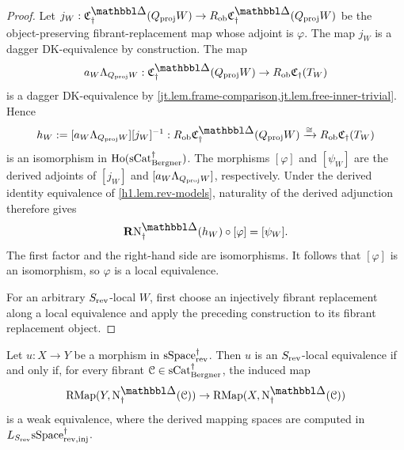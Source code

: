 \documentclass[a4paper,dvipdfmx,11pt]{amsart}
\begin{document}
\begin{proof}
  Let $j_W : \frakC^{\prism}_{\dag}(Q_{\proj}W) \to R_{\rmob}\frakC^{\prism}_{\dag}(Q_{\proj}W)$ be the object-preserving fibrant-replacement map whose adjoint is $\varphi$.
  The map $j_W$ is a dagger DK-equivalence by construction.
  The map
  \begin{align}
    a_W\Lambda_{Q_{\proj}W}:
    \frakC^{\prism}_{\dag}(Q_{\proj}W)
    \to
    R_{\rmob}\frakC_{\dag}(T_W)
  \end{align}
  is a dagger DK-equivalence by \cref{jt.lem.frame-comparison,jt.lem.free-inner-trivial}.
  Hence
  \begin{align}
    h_W
    :=
    [a_W\Lambda_{Q_{\proj}W}][j_W]^{-1}:
    R_{\rmob}
    \frakC^{\prism}_{\dag}(Q_{\proj}W)
    \xrightarrow{\cong}
    R_{\rmob}\frakC_{\dag}(T_W)
  \end{align}
  is an isomorphism in $\mathrm{Ho}(\mathrm{sCat}^{\dag}_{\mathrm{Bergner}})$.
  The morphisms $[\varphi]$ and $[\psi_W]$ are the derived adjoints of $[j_W]$ and
  $[a_W\Lambda_{Q_{\mathrm{proj}}W}]$, respectively.
  Under the derived identity equivalence of \cref{h1.lem.rev-models}, naturality of the derived adjunction therefore gives
  \begin{align}
    \bfR\N^{\prism}_{\dag}(h_W)
    \circ
    [\varphi]
    =
    [\psi_W].
  \end{align}
  The first factor and the right-hand side are isomorphisms.
  It follows that $[\varphi]$ is an isomorphism, so $\varphi$ is a local equivalence.

  For an arbitrary $S_{\mathrm{rev}}$-local $W$, first choose an injectively fibrant replacement along a local equivalence and apply the preceding construction to its fibrant replacement object.
\end{proof}

\begin{corollary}\label{jt.cor.frame-detection}
  Let $u:X\to Y$ be a morphism in $\mathrm{sSpace}^{\dag}_{\mathrm{rev}}$.
  Then $u$ is an $S_{\mathrm{rev}}$-local equivalence if and only if, for every fibrant $\mathcal{C}\in\mathrm{sCat}^{\dag}_{\mathrm{Bergner}}$, the induced map
  \begin{align}
    \RMap(Y,\N^{\prism}_{\dag}(\calC))
    \to 
    \RMap(X,\N^{\prism}_{\dag}(\calC))
  \end{align}
  is a weak equivalence, where the derived mapping spaces are computed in
  $L_{S_{\mathrm{rev}}}\mathrm{sSpace}^{\dag}_{\mathrm{rev},\mathrm{inj}}$.
\end{corollary}
\end{document}
